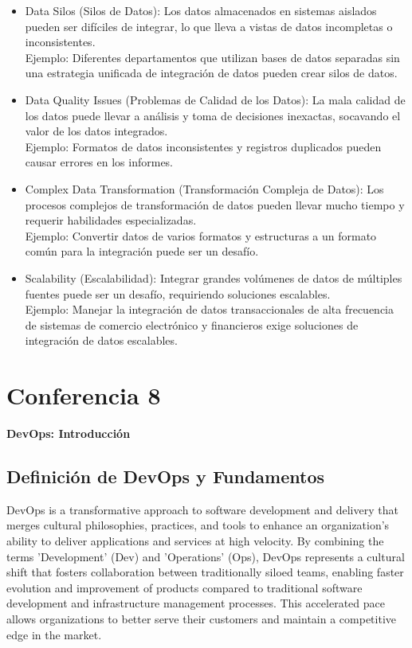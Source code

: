 \documentclass[12pt]{book}
\begin{document}
\begin{itemize}
    \item Data Silos (Silos de Datos): Los datos almacenados en sistemas aislados pueden ser difíciles de integrar, lo que lleva a vistas de datos incompletas o inconsistentes.\\
    Ejemplo: Diferentes departamentos que utilizan bases de datos separadas sin una estrategia unificada de integración de datos pueden crear silos de datos. 
    \item Data Quality Issues (Problemas de Calidad de los Datos): La mala calidad de los datos puede llevar a análisis y toma de decisiones inexactas, socavando el valor de los datos integrados.\\
    Ejemplo: Formatos de datos inconsistentes y registros duplicados pueden causar errores en los informes.
    \item Complex Data Transformation (Transformación Compleja de Datos): Los procesos complejos de transformación de datos pueden llevar mucho tiempo y requerir habilidades especializadas.\\
    Ejemplo: Convertir datos de varios formatos y estructuras a un formato común para la integración puede ser un desafío.
    \item Scalability (Escalabilidad): Integrar grandes volúmenes de datos de múltiples fuentes puede ser un desafío, requiriendo soluciones escalables.\\
    Ejemplo: Manejar la integración de datos transaccionales de alta frecuencia de sistemas de comercio electrónico y financieros exige soluciones de integración de datos escalables.
\end{itemize}



\chapter{Conferencia 8}
\normalfont\LARGE \textbf{DevOps: Introducción}
\normalfont\small\\


\section{Definición de DevOps y Fundamentos}

DevOps is a transformative approach to software development and delivery that merges cultural philosophies, practices, and tools to enhance an organization's ability to deliver applications and services at high velocity. By combining the terms 'Development' (Dev) and 'Operations' (Ops), DevOps represents a cultural shift that fosters collaboration between traditionally siloed teams, enabling faster evolution and improvement of products compared to traditional software development and infrastructure management processes. This accelerated pace allows organizations to better serve their customers and maintain a competitive edge in the market.
\end{document}
